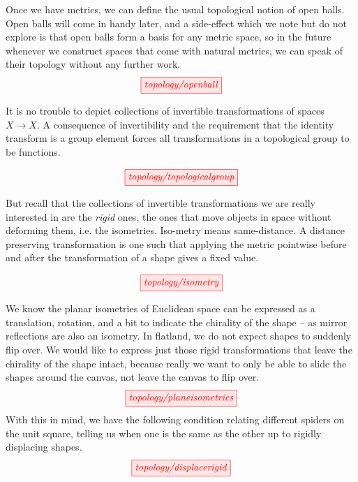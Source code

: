 \begin{myboxR}
\begin{defn}\label{def:openball}
Once we have metrics, we can define the usual topological notion of open balls. Open balls will come in handy later, and a side-effect which we note but do not explore is that open balls form a basis for any metric space, so in the future whenever we construct spaces that come with natural metrics, we can speak of their topology without any further work.
\[\tikzfig{topology/openball}\]
\end{defn}
\end{myboxR}

\begin{myboxB}
\begin{defn}\label{def:topgrp} 
It is no trouble to depict collections of invertible transformations of spaces $X \rightarrow X$. A consequence of invertibility and the requirement that the identity transform is a group element forces all transformations in a topological group to be functions.
\end{defn}
\[\tikzfig{topology/topologicalgroup}\]
\end{myboxB}

\begin{myboxR}
\begin{defn}[Isometry]\label{def:isometry}
But recall that the collections of invertible transformations we are really interested in are the \emph{rigid} ones, the ones that move objects in space without deforming them, i.e. the isometries. Iso-metry means same-distance. A distance preserving transformation is one such that applying the metric pointwise before and after the transformation of a shape gives a fixed value.
\end{defn}
\[\tikzfig{topology/isometry}\]
\end{myboxR}

\begin{myboxB}
\begin{defn}\label{defn:planarisometry}
We know the planar isometries of Euclidean space can be expressed as a translation, rotation, and a bit to indicate the chirality of the shape -- as mirror reflections are also an isometry. In flatland, we do not expect shapes to suddenly flip over. We would like to express just those rigid transformations that leave the chirality of the shape intact, because really we want to only be able to slide the shapes around the canvas, not leave the canvas to flip over.
\[\tikzfig{topology/planeisometries}\]
With this in mind, we have the following condition relating different spiders on the unit square, telling us when one is the same as the other up to rigidly displacing shapes.
\[\tikzfig{topology/displacerigid}\]
\end{defn}
\end{myboxB}

